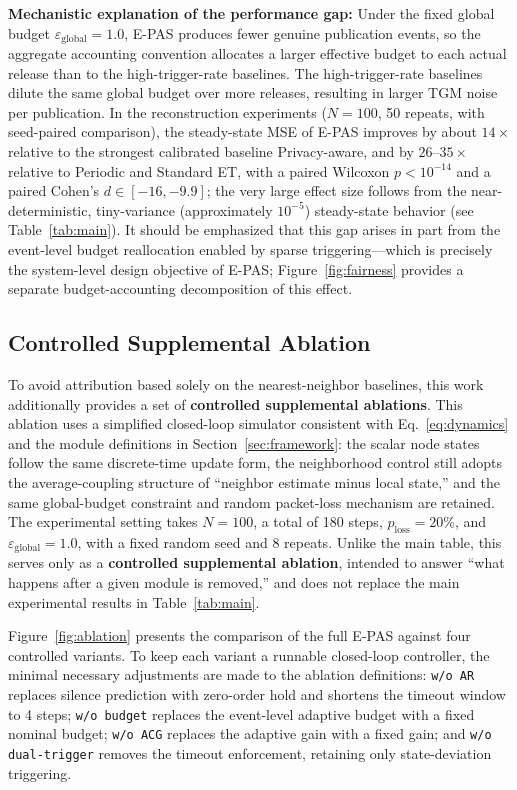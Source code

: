 \documentclass[10pt]{article}
\newcommand{\EPAS}{E-PAS}
\newcommand{\ploss}{p_{\text{loss}}}
\newcommand{\egl}{\varepsilon_{\text{global}}}
\begin{document}
\textbf{Mechanistic explanation of the performance gap:}
Under the fixed global budget $\egl=1.0$, \EPAS{} produces fewer genuine publication events, so the aggregate accounting convention allocates a larger effective budget to each actual release than to the high-trigger-rate baselines. The high-trigger-rate baselines dilute the same global budget over more releases, resulting in larger TGM noise per publication. In the reconstruction experiments ($N=100$, 50 repeats, with seed-paired comparison), the steady-state MSE of \EPAS{} improves by about $14\times$ relative to the strongest calibrated baseline Privacy-aware, and by $26$--$35\times$ relative to Periodic and Standard ET, with a paired Wilcoxon $p<10^{-14}$ and a paired Cohen's $d\in[-16,-9.9]$; the very large effect size follows from the near-deterministic, tiny-variance (approximately $10^{-5}$) steady-state behavior (see Table~\ref{tab:main}). It should be emphasized that this gap arises in part from the event-level budget reallocation enabled by sparse triggering---which is precisely the system-level design objective of \EPAS{}; Figure~\ref{fig:fairness} provides a separate budget-accounting decomposition of this effect.

\subsection{Controlled Supplemental Ablation}\label{sec:ablation}

To avoid attribution based solely on the nearest-neighbor baselines, this work additionally provides a set of \textbf{controlled supplemental ablations}. This ablation uses a simplified closed-loop simulator consistent with Eq.~\eqref{eq:dynamics} and the module definitions in Section~\ref{sec:framework}: the scalar node states follow the same discrete-time update form, the neighborhood control still adopts the average-coupling structure of ``neighbor estimate minus local state,'' and the same global-budget constraint and random packet-loss mechanism are retained. The experimental setting takes $N=100$, a total of 180 steps, $\ploss=20\%$, and $\egl=1.0$, with a fixed random seed and 8 repeats. Unlike the main table, this serves only as a \textbf{controlled supplemental ablation}, intended to answer ``what happens after a given module is removed,'' and does not replace the main experimental results in Table~\ref{tab:main}.

Figure~\ref{fig:ablation} presents the comparison of the full \EPAS{} against four controlled variants. To keep each variant a runnable closed-loop controller, the minimal necessary adjustments are made to the ablation definitions: \texttt{w/o AR} replaces silence prediction with zero-order hold and shortens the timeout window to 4 steps; \texttt{w/o budget} replaces the event-level adaptive budget with a fixed nominal budget; \texttt{w/o ACG} replaces the adaptive gain with a fixed gain; and \texttt{w/o dual-trigger} removes the timeout enforcement, retaining only state-deviation triggering.
\end{document}
